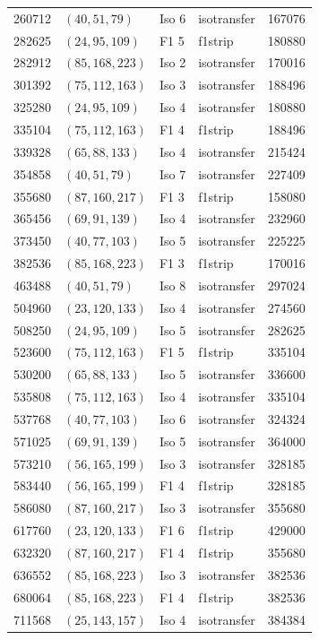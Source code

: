 \documentclass[11pt,reqno]{amsart}
\theoremstyle{plain}
\theoremstyle{definition}
\begin{document}
\begin{longtable}{rllll}
260712 & $(40,51,79)$ & Iso 6 & isotransfer & 167076 \\
282625 & $(24,95,109)$ & F1 5 & f1strip & 180880 \\
282912 & $(85,168,223)$ & Iso 2 & isotransfer & 170016 \\
301392 & $(75,112,163)$ & Iso 3 & isotransfer & 188496 \\
325280 & $(24,95,109)$ & Iso 4 & isotransfer & 180880 \\
335104 & $(75,112,163)$ & F1 4 & f1strip & 188496 \\
339328 & $(65,88,133)$ & Iso 4 & isotransfer & 215424 \\
354858 & $(40,51,79)$ & Iso 7 & isotransfer & 227409 \\
355680 & $(87,160,217)$ & F1 3 & f1strip & 158080 \\
365456 & $(69,91,139)$ & Iso 4 & isotransfer & 232960 \\
373450 & $(40,77,103)$ & Iso 5 & isotransfer & 225225 \\
382536 & $(85,168,223)$ & F1 3 & f1strip & 170016 \\
463488 & $(40,51,79)$ & Iso 8 & isotransfer & 297024 \\
504960 & $(23,120,133)$ & Iso 4 & isotransfer & 274560 \\
508250 & $(24,95,109)$ & Iso 5 & isotransfer & 282625 \\
523600 & $(75,112,163)$ & F1 5 & f1strip & 335104 \\
530200 & $(65,88,133)$ & Iso 5 & isotransfer & 336600 \\
535808 & $(75,112,163)$ & Iso 4 & isotransfer & 335104 \\
537768 & $(40,77,103)$ & Iso 6 & isotransfer & 324324 \\
571025 & $(69,91,139)$ & Iso 5 & isotransfer & 364000 \\
573210 & $(56,165,199)$ & Iso 3 & isotransfer & 328185 \\
583440 & $(56,165,199)$ & F1 4 & f1strip & 328185 \\
586080 & $(87,160,217)$ & Iso 3 & isotransfer & 355680 \\
617760 & $(23,120,133)$ & F1 6 & f1strip & 429000 \\
632320 & $(87,160,217)$ & F1 4 & f1strip & 355680 \\
636552 & $(85,168,223)$ & Iso 3 & isotransfer & 382536 \\
680064 & $(85,168,223)$ & F1 4 & f1strip & 382536 \\
711568 & $(25,143,157)$ & Iso 4 & isotransfer & 384384 \\

\end{longtable}
\end{document}
